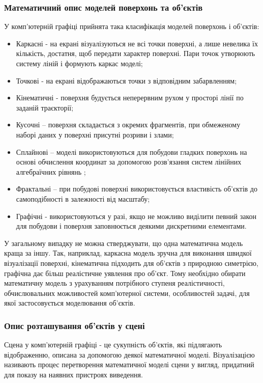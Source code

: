\let\mypdfximage\pdfximage\def\pdfximage{\immediate\mypdfximage}\documentclass[14pt,a4paper]{extarticle}
\theoremstyle{definition}
\renewcommand{\[}{\begin{singlespace}\begin{equation*}}
\renewcommand{\]}{\end{equation*}\end{singlespace}}
\renewcommand{\+}{\discretionary{\mbox{\scriptsize$\hookleftarrow$}}{}{}}
\begin{document}
\subsubsection{Математичний опис моделей поверхонь та об’єктів}

У комп'ютерній графіці прийнята така класифікація моделей поверхонь і об'єктів:
\begin{itemize}
\item Каркасні - на екрані візуалізуються не всі точки поверхні, а лише невелика їх кількість, достатня, щоб передати характер поверхні. Пари точок утворюють  систему ліній і формують каркас моделі;
\item Точкові - на екрані відображаються точки з відповідним забарвленням;
\item Кінематичні - поверхня будується неперервним рухом у просторі лінії по заданій траєкторії;
\item Кусочні – поверхня складається з окремих фрагментів,  при обмеженому наборі даних у поверхні присутні розриви і злами;
\item Сплайнові – моделі використовуються для побудови гладких поверхонь на основі обчислення координат за допомогою розв'язання систем лінійних алгебраїчних рівнянь \cite[с.~487]{parent};
\item Фрактальні – при побудові поверхні використовується властивість об'єктів до самоподібності в залежності від масштабу;
\item Графічні - використовуються у разі, якщо не можливо виділити певний закон для побудови і поверхня заповнюється деякими дискретними елементами.
\end{itemize}

У загальному випадку не можна стверджувати, що одна математична модель краща за іншу. Так, наприклад, каркасна модель зручна для виконання швидкої візуалізації поверхні, кінематична підходить для  об'єктів з природною симетрією, графічна дає більш реалістичне уявлення про об'єкт.  Тому необхідно обирати математичну модель з урахуванням потрібного ступеня реалістичності, обчислювальних можливостей комп'ютерної системи, особливостей задачі, для якої застосовується моделювання об'єктів.

\subsubsection{Опис розташування об'єктів у сцені}

Сцена у комп'ютерній графіці - це сукупність об'єктів, які підлягають відображенню, описана за допомогою деякої математичної моделі. Візуалізацією називають процес перетворення математичної моделі сцени у вигляд, придатний для показу на наявних пристроях виведення.
\end{document}
